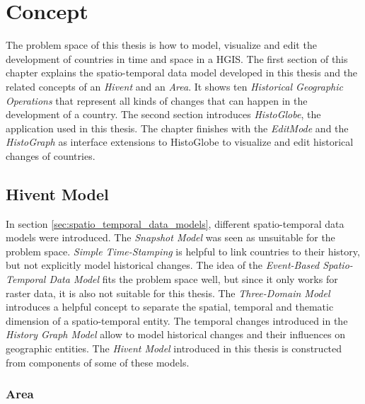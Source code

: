 
\chapter{Concept} %
\label{cha:concept}

The problem space of this thesis is how to model, visualize and edit the development of countries in time and space in a HGIS. The first section of this chapter explains the spatio-temporal data model developed in this thesis and the related concepts of an  \emph{Hivent} and an \emph{Area}. It shows ten \emph{Historical Geographic Operations} that represent all kinds of changes that can happen in the development of a country. The second section introduces \emph{HistoGlobe}, the application used in this thesis. The chapter finishes with the \emph{EditMode} and the \emph{HistoGraph} as interface extensions to HistoGlobe to visualize and edit historical changes of countries.


\section{Hivent Model} %
\label{sec:hivent_model}

In section \ref{sec:spatio_temporal_data_models}, different spatio-temporal data models were introduced. The \emph{Snapshot Model}  was seen as unsuitable for the problem space. \emph{Simple Time-Stamping} is helpful to link countries to their history, but not explicitly model historical changes. The idea of the \emph{Event-Based Spatio-Temporal Data Model} fits the problem space well, but since it only works for raster data, it is also not suitable for this thesis. The \emph{Three-Domain Model} introduces a helpful concept to separate the spatial, temporal and thematic dimension of a spatio-temporal entity. The temporal changes introduced in the \emph{History Graph Model} allow to model historical changes and their influences on geographic entities. The \emph{Hivent Model} introduced in this thesis is constructed from components of some of these models.


\subsection{Area} %
\label{sub:area}

